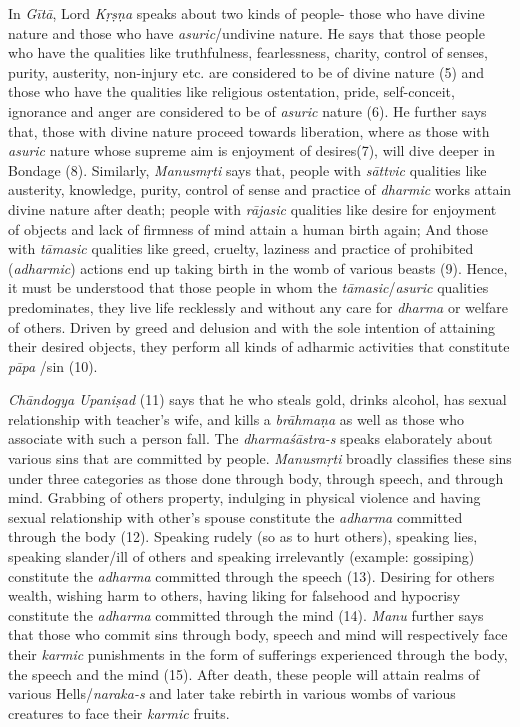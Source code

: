 {In \emph{Gītā}, Lord \emph{Kṛṣṇa} speaks about two kinds of people- those who have divine nature and those who have \emph{asuric}/undivine nature. He says that those people who have the qualities like truthfulness, fearlessness, charity, control of senses, purity, austerity, non-injury etc. are considered to be of divine nature (5) and those who have the qualities like religious ostentation, pride, self-conceit, ignorance and anger are considered to be of \emph{asuric} nature (6). He further says that, those with divine nature proceed towards liberation, where as those with \emph{asuric} nature whose supreme aim is enjoyment of desires(7), will dive deeper in Bondage (8). Similarly, \emph{Manusmṛti} says that, people with \emph{sāttvic} qualities like austerity, knowledge, purity, control of sense and practice of \emph{dharmic} works attain divine nature after death; people with \emph{rājasic} qualities like desire for enjoyment of objects and lack of firmness of mind attain a human birth again; And those with \emph{tāmasic} qualities like greed, cruelty, laziness and practice of prohibited (\emph{adharmic}) actions end up taking birth in the womb of various beasts (9). Hence, it must be understood that those people in whom the \emph{tāmasic}/\emph{asuric} qualities predominates, they live life recklessly and without any care for \emph{dharma} or welfare of others. Driven by greed and delusion and with the sole intention of attaining their desired objects, they perform all kinds of adharmic activities that constitute \emph{pāpa} /sin (10).

\emph{Chāndogya} \emph{Upaniṣad} (11) says that he who steals gold, drinks alcohol, has sexual relationship with teacher's wife, and kills a \emph{brāhmaṇa} as well as those who associate with such a person fall. The \emph{dharmaśāstra-s} speaks elaborately about various sins that are committed by people. \emph{Manusmṛti} broadly classifies these sins under three categories as those done through body, through speech, and through mind. Grabbing of others property, indulging in physical violence and having sexual relationship with other's spouse constitute the \emph{adharma} committed through the body (12). Speaking rudely (so as to hurt others), speaking lies, speaking slander/ill of others and speaking irrelevantly (example: gossiping) constitute the \emph{adharma} committed through the speech (13). Desiring for others wealth, wishing harm to others, having liking for falsehood and hypocrisy constitute the \emph{adharma} committed through the mind (14). \emph{Manu} further says that those who commit sins through body, speech and mind will respectively face their \emph{karmic} punishments in the form of sufferings experienced through the body, the speech and the mind (15). After death, these people will attain realms of various Hells/\emph{naraka-s} and later take rebirth in various wombs of various creatures to face their \emph{karmic} fruits.

}
